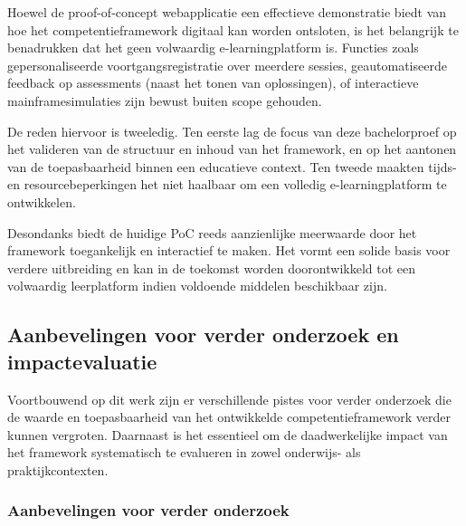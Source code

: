 Hoewel de proof-of-concept webapplicatie een effectieve demonstratie biedt van hoe het competentieframework digitaal kan worden ontsloten, is het belangrijk te benadrukken dat het geen volwaardig e-learningplatform is. Functies zoals gepersonaliseerde voortgangsregistratie over meerdere sessies, geautomatiseerde feedback op assessments (naast het tonen van oplossingen), of interactieve mainframesimulaties zijn bewust buiten scope gehouden.

De reden hiervoor is tweeledig. Ten eerste lag de focus van deze bachelorproef op het valideren van de structuur en inhoud van het framework, en op het aantonen van de toepasbaarheid binnen een educatieve context. Ten tweede maakten tijds- en resourcebeperkingen het niet haalbaar om een volledig e-learningplatform te ontwikkelen.

Desondanks biedt de huidige PoC reeds aanzienlijke meerwaarde door het framework toegankelijk en interactief te maken. Het vormt een solide basis voor verdere uitbreiding en kan in de toekomst worden doorontwikkeld tot een volwaardig leerplatform indien voldoende middelen beschikbaar zijn.

\subsection{Aanbevelingen voor verder onderzoek en impactevaluatie}

Voortbouwend op dit werk zijn er verschillende pistes voor verder onderzoek die de waarde en toepasbaarheid van het ontwikkelde competentieframework verder kunnen vergroten. Daarnaast is het essentieel om de daadwerkelijke impact van het framework systematisch te evalueren in zowel onderwijs- als praktijkcontexten.

\subsubsection{Aanbevelingen voor verder onderzoek}

